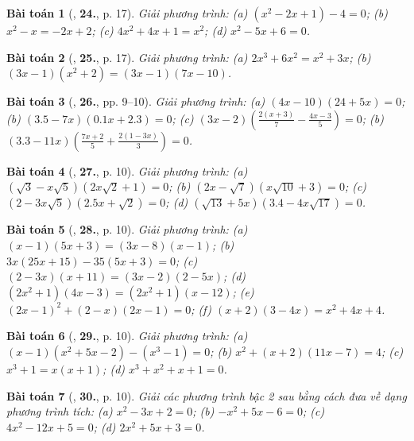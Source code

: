 \documentclass{article}
\numberwithin{equation}{section}
\newtheorem{baitoan}{Bài toán}
\begin{document}
\begin{baitoan}[\cite{SGK_Toan_8_tap_2}, \textbf{24.}, p. 17]
	Giải phương trình: (a) $(x^2 - 2x + 1) - 4 = 0$; (b) $x^2 - x = -2x + 2$; (c) $4x^2 + 4x + 1 = x^2$; (d) $x^2 - 5x + 6 = 0$.
\end{baitoan}

\begin{baitoan}[\cite{SGK_Toan_8_tap_2}, \textbf{25.}, p. 17]
	Giải phương trình: (a) $2x^3 + 6x^2 = x^2 + 3x$; (b) $(3x - 1)(x^2 + 2) = (3x - 1)(7x - 10)$.
\end{baitoan}

\begin{baitoan}[\cite{SBT_Toan_8_tap_2}, \textbf{26.}, pp. 9--10]
	Giải phương trình: (a) $(4x - 10)(24 + 5x) = 0$; (b) $(3.5 - 7x)(0.1x + 2.3) = 0$; (c) $(3x - 2)\left(\frac{2(x + 3)}{7} - \frac{4x - 3}{5}\right) = 0$; (b) $(3.3 - 11x)\left(\frac{7x + 2}{5} + \frac{2(1 - 3x)}{3}\right) = 0$.
\end{baitoan}

\begin{baitoan}[\cite{SBT_Toan_8_tap_2}, \textbf{27.}, p. 10]
	Giải phương trình: (a) $(\sqrt{3} - x\sqrt{5})(2x\sqrt{2} + 1) = 0$; (b) $(2x - \sqrt{7})(x\sqrt{10} + 3) = 0$; (c) $(2 - 3x\sqrt{5})(2.5x + \sqrt{2}) = 0$; (d) $(\sqrt{13} + 5x)(3.4 - 4x\sqrt{17}) = 0$.
\end{baitoan}

\begin{baitoan}[\cite{SBT_Toan_8_tap_2}, \textbf{28.}, p. 10]
	Giải phương trình: (a) $(x - 1)(5x + 3) = (3x - 8)(x - 1)$; (b) $3x(25x + 15) - 35(5x + 3) = 0$; (c) $(2 - 3x)(x + 11) = (3x - 2)(2 - 5x)$; (d) $(2x^2 + 1)(4x - 3) = (2x^2 + 1)(x - 12)$; (e) $(2x - 1)^2 + (2 - x)(2x - 1) = 0$; (f) $(x + 2)(3 - 4x) = x^2 + 4x + 4$.
\end{baitoan}

\begin{baitoan}[\cite{SBT_Toan_8_tap_2}, \textbf{29.}, p. 10]
	Giải phương trình: (a) $(x - 1)(x^2 + 5x - 2) - (x^3 - 1) = 0$; (b) $x^2 + (x + 2)(11x - 7) = 4$; (c) $x^3 + 1 = x(x + 1)$; (d) $x^3 + x^2 + x + 1 = 0$.
\end{baitoan}

\begin{baitoan}[\cite{SBT_Toan_8_tap_2}, \textbf{30.}, p. 10]
	Giải các phương trình bậc 2 sau bằng cách đưa về dạng phương trình tích: (a) $x^2 - 3x + 2 = 0$; (b) $-x^2 + 5x - 6 = 0$; (c) $4x^2 - 12x + 5 = 0$; (d) $2x^2 + 5x + 3 = 0$.
\end{baitoan}
\end{document}
